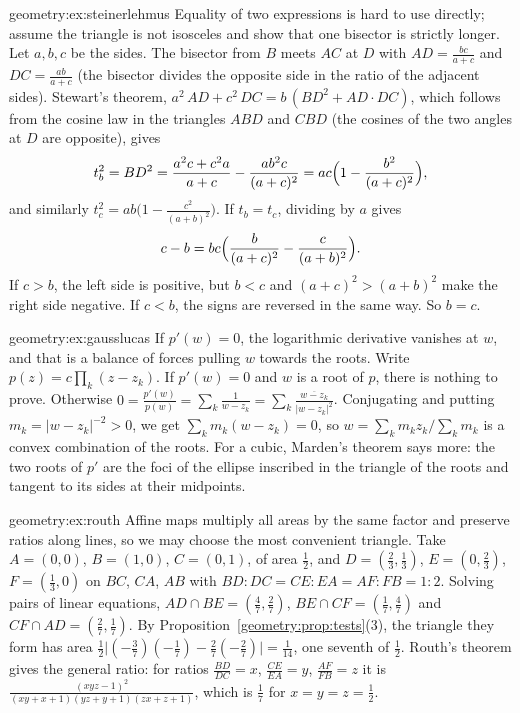 \begin{solution}{geometry:ex:steinerlehmus}
\idea Equality of two expressions is hard to use directly; assume the triangle is not isosceles and show that one bisector is strictly
longer.
\writeup Let $a,b,c$ be the sides. The bisector from $B$ meets $AC$ at $D$ with $AD=\frac{bc}{a+c}$ and $DC=\frac{ab}{a+c}$ (the bisector
divides the opposite side in the ratio of the adjacent sides). Stewart's theorem, $a^2\,AD+c^2\,DC=b\,(BD^2+AD\cdot DC)$, which follows from the
cosine law in the triangles $ABD$ and $CBD$ (the cosines of the two angles at $D$ are opposite), gives
\[
t_b^2=BD^2=\frac{a^2c+c^2a}{a+c}-\frac{ab^2c}{(a+c)^2}=ac\Bigl(1-\frac{b^2}{(a+c)^2}\Bigr),
\]
and similarly $t_c^2=ab\bigl(1-\frac{c^2}{(a+b)^2}\bigr)$. If $t_b=t_c$, dividing by $a$ gives
\[
c-b=bc\Bigl(\frac b{(a+c)^2}-\frac c{(a+b)^2}\Bigr).
\]
If $c>b$, the left side is positive, but $b<c$ and $(a+c)^2>(a+b)^2$ make the right side negative. If $c<b$, the signs are reversed in
the same way. So $b=c$.
\end{solution}

\begin{solution}{geometry:ex:gausslucas}
\idea If $p'(w)=0$, the logarithmic derivative vanishes at $w$, and that is a balance of forces pulling $w$ towards the roots.
\writeup Write $p(z)=c\prod_k(z-z_k)$. If $p'(w)=0$ and $w$ is a root of $p$, there is nothing to prove. Otherwise
$0=\frac{p'(w)}{p(w)}=\sum_k\frac1{w-z_k}=\sum_k\frac{\overline{w-z_k}}{|w-z_k|^2}$. Conjugating and putting $m_k=|w-z_k|^{-2}>0$, we get
$\sum_km_k(w-z_k)=0$, so $w=\sum_km_kz_k/\sum_km_k$ is a convex combination of the roots. For a cubic, Marden's theorem says more: the two
roots of $p'$ are the foci of the ellipse inscribed in the triangle of the roots and tangent to its sides at their midpoints.
\end{solution}

\begin{solution}{geometry:ex:routh}
\idea Affine maps multiply all areas by the same factor and preserve ratios along lines, so we may choose the most convenient triangle.
\writeup Take $A=(0,0)$, $B=(1,0)$, $C=(0,1)$, of area $\frac12$, and $D=(\frac23,\frac13)$, $E=(0,\frac23)$, $F=(\frac13,0)$ on $BC$, $CA$, $AB$
with $BD:DC=CE:EA=AF:FB=1:2$. Solving pairs of linear equations, $AD\cap BE=(\frac47,\frac27)$, $BE\cap CF=(\frac17,\frac47)$ and
$CF\cap AD=(\frac27,\frac17)$. By Proposition~\ref{geometry:prop:tests}(3), the triangle they form has area
$\frac12\bigl|(-\frac37)(-\frac17)-\frac27(-\frac27)\bigr|=\frac1{14}$, one seventh of $\frac12$. Routh's theorem gives the general ratio: for
ratios $\frac{BD}{DC}=x$, $\frac{CE}{EA}=y$, $\frac{AF}{FB}=z$ it is $\frac{(xyz-1)^2}{(xy+x+1)(yz+y+1)(zx+z+1)}$, which is $\frac17$ for $x=y=z=\frac12$.
\end{solution}


